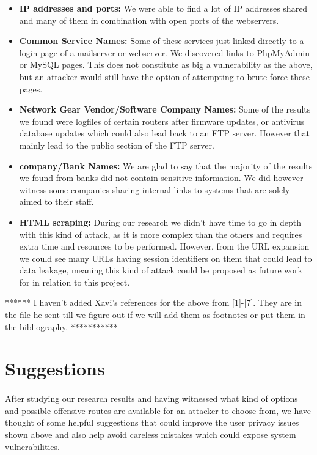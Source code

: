 \documentclass[12pt]{article}
\begin{document}
\begin{itemize}
\item \textbf{IP addresses and ports:}  We were able to find a lot of IP addresses shared and many of them in combination with open ports of the webservers.

\item \textbf{Common Service Names:} Some of these services just linked directly to a login page of a mailserver or webserver. We discovered links to PhpMyAdmin or MySQL pages. This does not constitute as big a vulnerability as the above, but an attacker would still have the option of attempting to brute force these pages.

\item \textbf{Network Gear Vendor/Software Company Names:} Some of the results we found were logfiles of certain routers after firmware updates, or antivirus database updates which could also lead back to an FTP server. However that mainly lead to the public section of the FTP server.

\item \textbf{company/Bank Names:} We are glad to say that the majority of the results we found from banks did not contain sensitive information. We did however witness some companies sharing internal links to systems that are solely aimed to their staff.

\item \textbf{HTML scraping:} During our research we didn't have time to go in depth with this kind of attack, as it is more complex than the others and requires extra time and resources to be performed. However, from the URL expansion we could see many URLs having session identifiers on them that could lead to data leakage, meaning this kind of attack could be proposed as future work for in relation to this project.

\end{itemize}

****** I haven't added Xavi's references for the above from [1]-[7]. They are in the file he sent till we figure out if we will add them as footnotes or put them in the bibliography. ***********

\section{Suggestions}

\paragraph{}
 After studying our research results and having witnessed what kind of options and possible offensive routes are available for an attacker to choose from, we have thought of some helpful suggestions that could improve the user privacy issues shown above and also help avoid careless mistakes which could expose system vulnerabilities.
\end{document}

